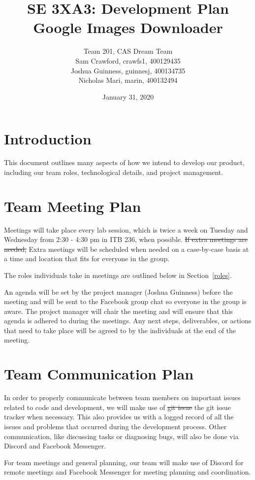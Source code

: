 \documentclass{article}
\title{SE 3XA3: Development Plan\\Google Images Downloader}
\author{Team 201, CAS Dream Team
		\\ Sam Crawford, crawfs1, 400129435
		\\ Joshua Guinness, guinnesj, 400134735
		\\ Nicholas Mari, marin, 400132494
}
\date{January 31, 2020}
\begin{document}

\maketitle

\tableofcontents

\newpage

\section{Introduction}
This document outlines many aspects of how we intend to develop our product, 
including our team roles, technological details, and project management.

\section{Team Meeting Plan}
Meetings will take place every lab session, which is twice a week on Tuesday and 
Wednesday from 2:30 - 4:30 pm in ITB 236, when possible. \st{If extra meetings are 
needed,} \color{red} Extra meetings will be scheduled when needed on a case-by-case 
basis at \color{black} a time and location that fits for everyone in the group.

The roles individuals take in meetings are outlined below in Section~\ref{roles}. 

An agenda will be set by the project manager (Joshua Guinness) before the 
meeting and will be sent to the Facebook group chat so everyone in the group is 
aware. The project manager will chair the meeting and will ensure that this 
agenda is adhered to during the meetings. Any next steps, deliverables, or actions 
that need to take place will be agreed to by the individuals at the end of the meeting. 

\section{Team Communication Plan}
In order to properly communicate between team members on important issues 
related to code and development, we will make use of \st{git issue} \color{red} the 
git issue tracker when necessary\color{black}. This also provides us 
with a logged record of all the issues and problems that occurred during the development process. \color{red}Other communication, like discussing tasks or diagnosing bugs, will also be done via Discord and Facebook Messenger.\color{black}

For team meetings and general planning, our team will make use of Discord for 
remote meetings and Facebook Messenger for meeting planning and coordination.
\end{document}
